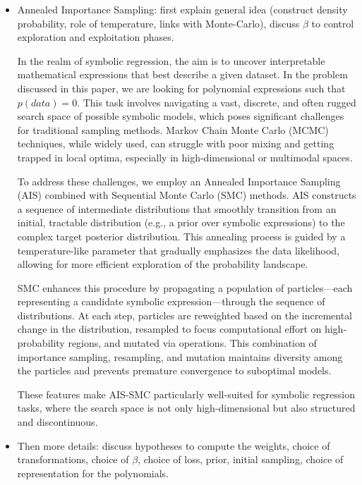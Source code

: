 \documentclass[11pt]{article}
\begin{document}
\begin{itemize}[label=\textbullet]
		\item Annealed Importance Sampling: first explain general idea (construct density probability, role of temperature, links with Monte-Carlo), discuss $\beta$ to control exploration and exploitation phases.
		
		In the realm of symbolic regression, the aim is to uncover interpretable mathematical expressions that best describe a given dataset. In the problem discussed in this paper, we are looking for polynomial expressions such that $p(data) = 0$. This task involves navigating a vast, discrete, and often rugged search space of possible symbolic models, which poses significant challenges for traditional sampling methods. Markov Chain Monte Carlo (MCMC) techniques, while widely used, can struggle with poor mixing and getting trapped in local optima, especially in high-dimensional or multimodal spaces.
		
		To address these challenges, we employ an Annealed Importance Sampling (AIS) combined with Sequential Monte Carlo (SMC) methods. AIS constructs a sequence of intermediate distributions that smoothly transition from an initial, tractable distribution (e.g., a prior over symbolic expressions) to the complex target posterior distribution. This annealing process is guided by a temperature-like parameter that gradually emphasizes the data likelihood, allowing for more efficient exploration of the probability landscape.
		
		SMC enhances this procedure by propagating a population of particles—each representing a candidate symbolic expression—through the sequence of distributions. At each step, particles are reweighted based on the incremental change in the distribution, resampled to focus computational effort on high-probability regions, and mutated via operations. This combination of importance sampling, resampling, and mutation maintains diversity among the particles and prevents premature convergence to suboptimal models.
		
		These features make AIS-SMC particularly well-suited for symbolic regression tasks, where the search space is not only high-dimensional but also structured and discontinuous. 
		
		\item Then more details: discuss hypotheses to compute the weights, choice of transformations, choice of $\beta$, choice of loss, prior, initial sampling, choice of representation for the polynomials.
		

\end{itemize}
\end{document}
